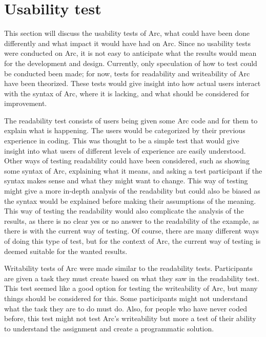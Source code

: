 %

\section{Usability test}
This section will discuss the usability tests of Arc, what could have been done differently and what impact it would have had on Arc. Since no usability tests were conducted on Arc, it is not easy to anticipate what the results would mean for the development and design. Currently, only speculation of how to test could be conducted been made; for now, tests for readability and writeability of Arc have been theorized. These tests would give insight into how actual users interact with the syntax of Arc, where it is lacking, and what should be considered for improvement. 

The readability test consists of users being given some Arc code and for them to explain what is happening. The users would be categorized by their previous experience in coding. This was thought to be a simple test that would give insight into what users of different levels of experience are easily understood. Other ways of testing readability could have been considered, such as showing some syntax of Arc, explaining what it means, and asking a test participant if the syntax makes sense and what they might want to change. This way of testing might give a more in-depth analysis of the readability but could also be biased as the syntax would be explained before making their assumptions of the meaning. This way of testing the readability would also complicate the analysis of the results, as there is no clear yes or no answer to the readability of the example, as there is with the current way of testing. Of course, there are many different ways of doing this type of test, but for the context of Arc, the current way of testing is deemed suitable for the wanted results.

Writability tests of Arc were made similar to the readability tests. Participants are given a task they must create based on what they saw in the readability test. This test seemed like a good option for testing the writeability of Arc, but many things should be considered for this. Some participants might not understand what the task they are to do must do. Also, for people who have never coded before, this test might not test Arc's writeability but more a test of their ability to understand the assignment and create a programmatic solution. 

